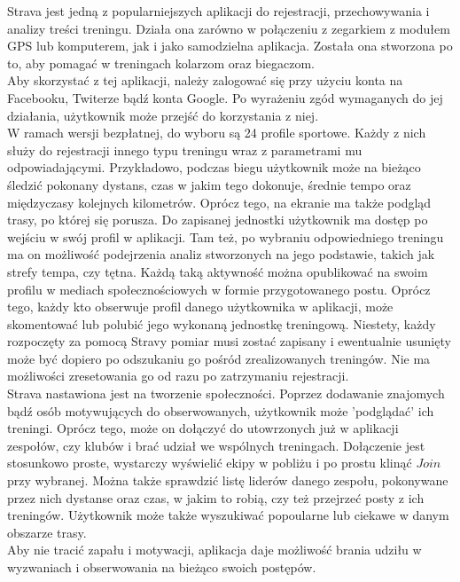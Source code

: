 \documentclass[a4paper,12pt,reqno]{article}
\begin{document}
Strava jest jedną z popularniejszych aplikacji do rejestracji, przechowywania i analizy treści treningu.
Działa ona zarówno w połączeniu z zegarkiem z modułem GPS lub komputerem, jak i jako samodzielna aplikacja. Została ona stworzona po to, aby pomagać w treningach kolarzom oraz biegaczom.\\

Aby skorzystać z tej aplikacji, należy zalogować się przy użyciu konta na Facebooku, Twiterze bądź konta Google. Po wyrażeniu zgód wymaganych do jej działania, użytkownik może przejść do korzystania z niej.\\

W ramach wersji bezpłatnej, do wyboru są 24 profile sportowe. Każdy z nich służy do rejestracji innego typu treningu wraz z parametrami mu odpowiadającymi. Przykładowo, podczas biegu użytkownik może na bieżąco śledzić pokonany dystans, czas w jakim tego dokonuje, średnie tempo oraz międzyczasy kolejnych kilometrów. Oprócz tego, na ekranie ma także podgląd trasy, po której się porusza. Do zapisanej jednostki użytkownik ma dostęp po wejściu w swój profil w aplikacji. Tam też, po wybraniu odpowiedniego treningu ma on możliwość podejrzenia analiz stworzonych na jego podstawie, takich jak strefy tempa, czy tętna. Każdą taką aktywność można opublikować na swoim profilu w mediach społecznościowych w formie przygotowanego postu. Oprócz tego, każdy kto obserwuje profil danego użytkownika w aplikacji, może skomentować lub polubić jego wykonaną jednostkę treningową.
Niestety, każdy rozpoczęty za pomocą Stravy pomiar musi zostać zapisany i ewentualnie usunięty może być dopiero po odszukaniu go pośród zrealizowanych treningów. Nie ma możliwości zresetowania go od razu po zatrzymaniu rejestracji.\\

Strava nastawiona jest na tworzenie społeczności. Poprzez dodawanie znajomych bądź osób motywujących do obserwowanych, użytkownik może 'podglądać' ich treningi. Oprócz tego, może on dołączyć do utowrzonych już w aplikacji zespołów, czy klubów i brać udział we wspólnych treningach. Dołączenie jest stosunkowo proste, wystarczy wyświelić ekipy w pobliżu i po prostu klinąć $Join$ przy wybranej. Można także sprawdzić listę liderów danego zespołu, pokonywane przez nich dystanse oraz czas, w jakim to robią, czy też przejrzeć posty z ich treningów. Użytkownik może także wyszukiwać popoularne lub ciekawe w danym obszarze trasy.\\
Aby nie tracić zapału i motywacji, aplikacja daje możliwość brania udziłu w wyzwaniach i obserwowania na bieżąco swoich postępów.\\
\end{document}
